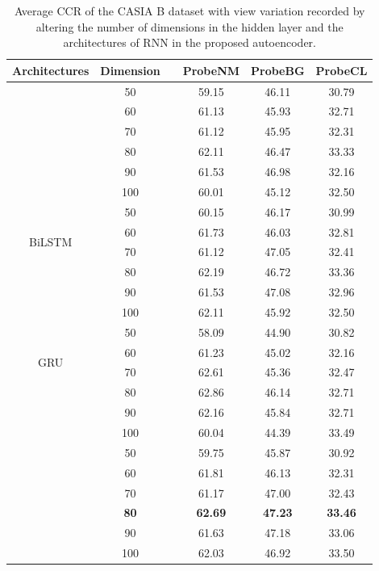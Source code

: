 \begin{table}[t]
	\centering
	\caption [Average CCR of the CASIA B dataset with view variation recorded by altering the number of dimensions in the hidden layer and the architectures of RNN in the proposed autoencoder] {Average CCR of the CASIA B dataset with view variation recorded by altering the number of dimensions in the hidden layer and the architectures of RNN in the proposed autoencoder.} \label{table:exp_proposed_rnn_architecture}
	{\begin{tabular*}{28pc}{cc cccc}\hline  \rule{0pt}{2ex}
			Architectures &Dimension &&ProbeNM &ProbeBG &ProbeCL \\ \hline\rule{0pt}{3ex}
			
			\multirow{4}{*}{LSTM} &50 &&59.15 &46.11 &30.79 \\\rule{0pt}{8px}
			&60 &&61.13 &45.93 &32.71 \\\rule{0pt}{2ex}
			&70 &&61.12 &45.95 &32.31 \\\rule{0pt}{2ex}
			& 80 && 62.11 & 46.47 & 33.33 \\\rule{0pt}{2ex}
			&90 &&61.53 &46.98 &32.16 \\\rule{0pt}{2ex}
			&100 &&60.01 &45.12 &32.50 \\\hline
			
			
			\multirow{4}{*}{BiLSTM} &50 &&60.15 &46.17 &30.99 \\\rule{0pt}{8px}
			&60 &&61.73 &46.03 &32.81 \\\rule{0pt}{2ex}
			&70 &&61.12 &47.05 &32.41 \\\rule{0pt}{2ex}
			& 80 && 62.19 & 46.72 & 33.36 \\\rule{0pt}{2ex}
			&90 &&61.53 &47.08 &32.96 \\\rule{0pt}{2ex}
			&100 &&62.11 &45.92 &32.50 \\\hline
			
			\multirow{4}{*}{GRU} &50 &&58.09 &44.90 &30.82 \\\rule{0pt}{5px}
			&60 &&61.23 &45.02 &32.16 \\\rule{0pt}{2ex}
			&70 &&62.61 &45.36 &32.47 \\\rule{0pt}{2ex}
			&80 &&62.86 &46.14 &32.71 \\\rule{0pt}{2ex}
			&90 &&62.16 &45.84 &32.71 \\\rule{0pt}{2ex}
			&100 &&60.04 &44.39 &33.49 \\\hline\rule{0pt}{2ex}
			
			
			\multirow{4}{*}{BiGRU} &50 &&59.75 &45.87 &30.92 \\\rule{0pt}{8px}
			&60 &&61.81 &46.13 &32.31 \\\rule{0pt}{2ex}
			&70 &&61.17 &47.00 &32.43 \\\rule{0pt}{2ex}
			&\textbf{80} &&\textbf{62.69} &\textbf{47.23} &\textbf{33.46} \\\rule{0pt}{2ex}
			&90 &&61.63 &47.18 &33.06 \\\rule{0pt}{2ex}
			&100 &&62.03 &46.92 &33.50 \\\hline
	\end{tabular*}}{} 
\end{table}


